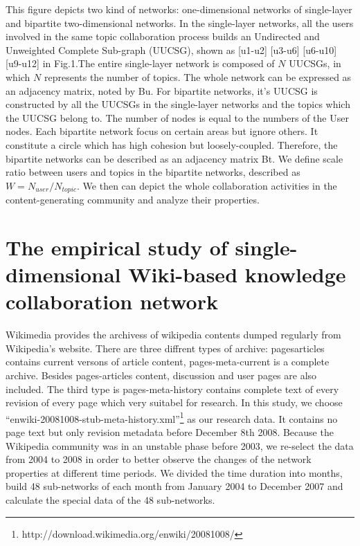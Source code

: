 \documentclass{elsarticle}
\begin{document}
This figure depicts  two kind of  networks: one-dimensional networks of
single-layer and bipartite two-dimensional networks. 
In the single-layer networks, all the users involved in the same topic
collaboration process builds an Undirected and Unweighted Complete
Sub-graph (UUCSG), shown as [u1-u2] [u3-u6] [u6-u10] [u9-u12] in
Fig.1.The entire single-layer network is composed of $N$ UUCSGs, in
which $N$ represents the number of topics. The whole network can be
expressed as an adjacency matrix, noted by Bu.
For bipartite networks, it's UUCSG is constructed by all the UUCSGs in
 the single-layer networks and the topics which the UUCSG belong
 to. The number of nodes is equal to the numbers of the User
 nodes. Each bipartite network focus on  certain areas but ignore
 others. It  constitute a circle which has high
 cohesion but loosely-coupled. Therefore, the bipartite networks can be described as an
 adjacency matrix Bt. We define scale ratio  between users and topics  in
 the bipartite networks,
 described as
 \begin{math}
 W = N_{user}/N_{topic}   
 \end{math}.
We then can depict the whole collaboration activities in the
content-generating community and analyze their properties.

\section{The empirical study of single-dimensional Wiki-based knowledge collaboration network}
\label{sec:empir-study-single}
Wikimedia provides the archivess of  wikipedia contents dumped
regularly from
Wikipedia's website.  There are three diffrent types of archive: 
pages\nobreakdash{-}articles contains current versons of article content,
pages-meta-current is  a   complete archive. Besides pages-articles
content, discussion and user pages are also included.  The third type
is pages-meta-history contains complete text of every revision of
every page which very suitabel  for research.
In this study, we choose
“enwiki-20081008-stub-meta-history.xml”\footnote{http://download.wikimedia.org/enwiki/20081008/} as our research
data. It contains no page text but only revision metadata before
December 8th 2008. Because the Wikipedia community was in an unstable
phase before 2003, we re-select the data from 2004 to 2008 in order to
better observe the changes of the network  properties at different time periods. We divided the time duration into months, build 48 sub-networks of each month from January 2004 to December 2007 and calculate the special data of the 48 sub-networks.
\end{document}
